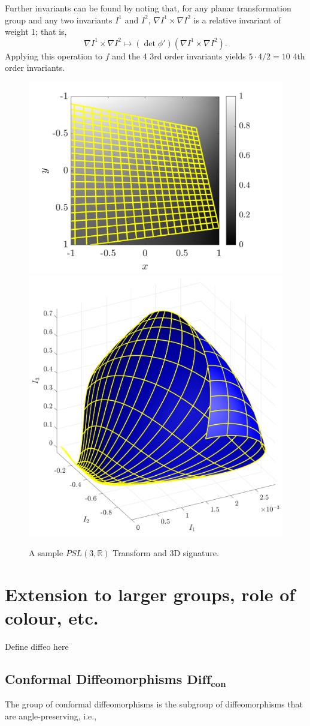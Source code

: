 \documentclass[review,onefignum,onetabnum]{siamonline190516}
\begin{document}
Further invariants can be found by noting that, for any planar transformation group and any two invariants
$I^1$ and $I^2$, $\nabla I^1 \times \nabla I^2$ is a relative invariant of weight 1; that is,
$$\nabla I^1 \times \nabla I^2\mapsto (\det \phi')(\nabla I^1 \times \nabla I^2).$$
Applying this operation to $f$ and the 4 3rd order invariants yields $5\cdot4/2=1$0  4th order invariants.

\begin{figure}
\centering
\includegraphics[width=.45\textwidth]{Figs/f_transformed_PSL3R.png}
\includegraphics[width=.45\textwidth]{Figs/PSL3R_signature.png}
\caption{A sample $PSL(3,\mathbb{R})$ Transform and 3D signature.}
\label{fig:PSL3R}
\end{figure}

\section{Extension to larger groups, role of colour, etc.}
\label{sec:aaah}

Define diffeo here

\subsection{Conformal Diffeomorphisms $\mathbf{Diff}_{\mathbf{con}}$}

The group of conformal diffeomorphisms is the subgroup of diffeomorphisms that are angle-preserving, i.e.,
\end{document}
